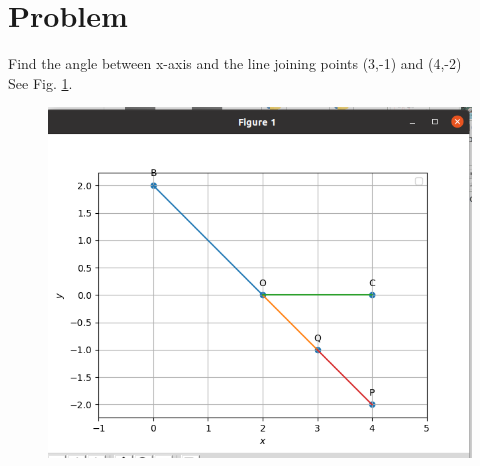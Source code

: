 \documentclass[10pt, a4paper]{article}
\begin{document}
\title{\mytitle}
\author{\myauthor\hspace{1em}\\\contact\\FWC22045\hspace{6.5em}IITH\hspace{0.5em}\mymodule\hspace{6em}Matrix:Lines}

\date{}
\maketitle


  \section{Problem}
  \fi
Find the angle between x-axis and the line joining points (3,-1) and (4,-2)
\\
\solution See Fig. 
		\ref{fig:11/10/1/10}.
	\begin{figure}[!ht]
		\centering
 \includegraphics[width=\columnwidth]{chapters/11/10/1/10/figs/fig.png}
		\caption{}
		\label{fig:11/10/1/10}
  	\end{figure}

	\iffalse
\end{document}
